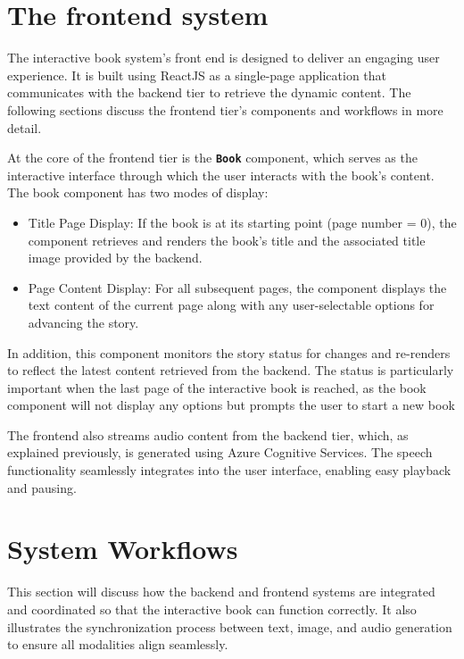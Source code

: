 \documentclass[conference]{IEEEtran}
\begin{document}
	
	\section{The frontend system}
	
	The interactive book system's front end is designed to deliver an engaging user experience. It is built using ReactJS as a single-page application that communicates with the backend tier to retrieve the dynamic content. The following sections discuss the frontend tier's components and workflows in more detail.
	
	At the core of the frontend tier is the \textbf{\texttt{Book}} component, which serves as the interactive interface through which the user interacts with the book's content. The book component has two modes of display:
	
	\begin{itemize}
		\item Title Page Display: If the book is at its starting point (page number = 0), the component retrieves and renders the book's title and the associated title image provided by the backend.
		\item Page Content Display: For all subsequent pages, the component displays the text content of the current page along with any user-selectable options for advancing the story.
	\end{itemize}
	
	In addition, this component monitors the story status for changes and re-renders to reflect the latest content retrieved from the backend. The status is particularly important when the last page of the interactive book is reached, as the book component will not display any options but prompts the user to start a new book
	
	The frontend also streams audio content from the backend tier, which, as explained previously, is generated using Azure Cognitive Services. The speech functionality seamlessly integrates into the user interface, enabling easy playback and pausing.
	
	
	\section{System Workflows}
	
	This section will discuss how the backend and frontend systems are integrated and coordinated so that the interactive book can function correctly. It also illustrates the synchronization process between text, image, and audio generation to ensure all modalities align seamlessly.
	
\end{document}
